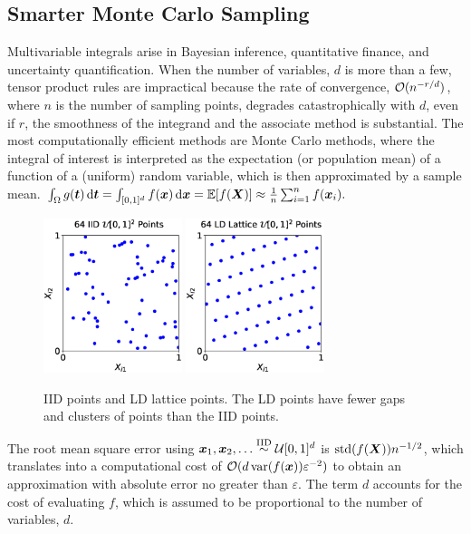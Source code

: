\subsection{Smarter Monte Carlo Sampling}

Multivariable integrals arise in Bayesian inference, quantitative finance, and uncertainty quantification.  When the number of variables, $d$ is more than a few, tensor product rules are impractical because the rate of convergence, $\mathcal{O}(n^{-r/d})$, where $n$ is the number of sampling points, degrades catastrophically with $d$, even if $r$, the smoothness of the integrand and the associate method is substantial.  The most computationally efficient methods are Monte Carlo methods, where the integral of interest is interpreted as the expectation (or population mean) of a function of a (uniform) random variable, which is then approximated by a sample mean.
$
    \int_{\Omega} g({\boldsymbol{t}}) \, \textup{d} {\boldsymbol{t}} = \int_{[0,1]^d} f({\boldsymbol{x}}) \, \textup{d} {\boldsymbol{x}} = \mathbb{E}[f({\boldsymbol{X}})] \approx \frac 1n \sum_{i=1}^n f({\boldsymbol{x}}_i).
$

 \begin{figure}
	\centering
	\includegraphics[height = 4.5cm]{iid_scatter.eps} \quad
	\includegraphics[height = 4.5cm]{lattice_scatter.eps}
	\caption{IID points and LD lattice points.  The LD points have fewer gaps and clusters of points than the IID points. \label{fig:iid_vs_ld}}
\end{figure}


The root mean square error using ${\boldsymbol{x}}_1, {\boldsymbol{x}}_2, \ldots \overset{\text{IID}}{\sim} {\mathcal{U}}[0,1]^d$ is $\operatorname{std}(f({\boldsymbol{X}})) n^{-1/2}$, which translates into a computational cost of $\mathcal{O}(d\operatorname{var}(f({\boldsymbol{x}}))\varepsilon^{-2})$ to obtain an approximation with absolute error no greater than $\varepsilon$. The term $d$ accounts for the cost of evaluating $f$, which is assumed to be proportional to the number of variables, $d$.


